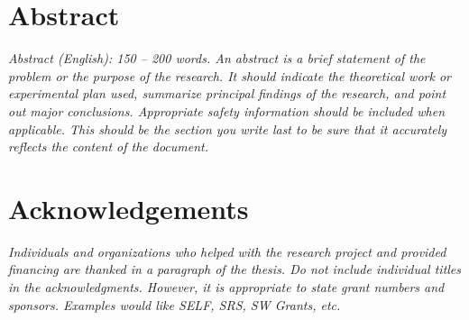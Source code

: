 \documentclass[11pt,a4paper,oneside]{report}
\newcommand{\instructions}[1]{{\color{black}\itshape #1}}
\begin{document}

\clearpage
{}


\setcounter{tocdepth}{0} %
\tableofcontents


\chapter*{Abstract}


\instructions{Abstract (English): 150 -- 200 words. An abstract is a brief
statement of the problem or the purpose of the research. It should indicate
the theoretical work or experimental plan used, summarize principal findings
of the research, and point out major conclusions. Appropriate safety
information should be included when applicable. This should be the section
you write last to be sure that it accurately reflects the content of the 
document.}

\vspace{4\bigskipamount}




\chapter*{Acknowledgements}
\label{acknowledgements}

\instructions{Individuals and organizations who helped with the research project
and provided financing are thanked in a paragraph of the thesis. Do not
include individual titles in the acknowledgments. However, it is
appropriate to state grant numbers and sponsors. Examples would like
SELF, SRS, SW Grants, etc.}

\newpage


\setcounter{tocdepth}{1}
\listoffigures\newpage
\end{document}
